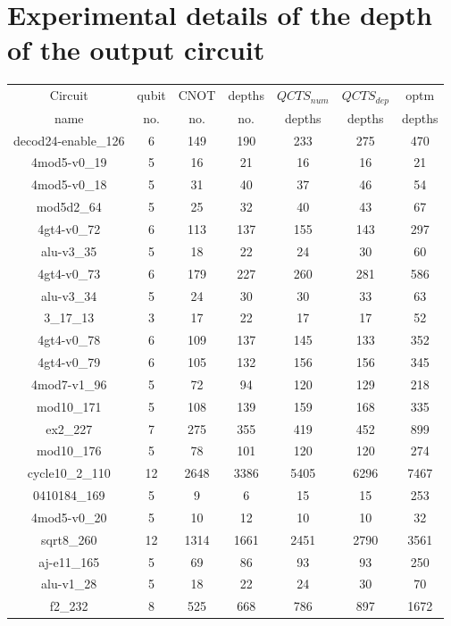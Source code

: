 \documentclass[runningheads]{llncs}
\begin{document}
\section{Experimental details of the depth of the output circuit}
					\begin{table}[H]
						\begin{center}  
						\begin{tabular}{|c|c|c|c|c|c|c|}
						\hline
						Circuit &  qubit  & CNOT &depths &$QCTS_{num}$& $QCTS_{dep}$  & optm 	  	\\
						 name	&   no. 	&	no. & no. & depths&  depths &  depths 	\\
						\hline
						decod24-enable\_126 & 6 & 149 & 190 & 233 & 275 & 470 \\
4mod5-v0\_19 & 5 & 16 & 21 & 16 & 16 & 21 \\
4mod5-v0\_18 & 5 & 31 & 40 & 37 & 46 & 54 \\
mod5d2\_64 & 5 & 25 & 32 & 40 & 43 & 67 \\
4gt4-v0\_72 & 6 & 113 & 137 & 155 & 143 & 297 \\
alu-v3\_35 & 5 & 18 & 22 & 24 & 30 & 60 \\
4gt4-v0\_73 & 6 & 179 & 227 & 260 & 281 & 586 \\
alu-v3\_34 & 5 & 24 & 30 & 30 & 33 & 63 \\
3\_17\_13 & 3 & 17 & 22 & 17 & 17 & 52 \\
4gt4-v0\_78 & 6 & 109 & 137 & 145 & 133 & 352 \\
4gt4-v0\_79 & 6 & 105 & 132 & 156 & 156 & 345 \\
4mod7-v1\_96 & 5 & 72 & 94 & 120 & 129 & 218 \\
mod10\_171 & 5 & 108 & 139 & 159 & 168 & 335 \\
ex2\_227 & 7 & 275 & 355 & 419 & 452 & 899 \\
mod10\_176 & 5 & 78 & 101 & 120 & 120 & 274 \\
cycle10\_2\_110 & 12 & 2648 & 3386 & 5405 & 6296 & 7467 \\
0410184\_169 & 5 & 9 & 6 & 15 & 15 & 253 \\
4mod5-v0\_20 & 5 & 10 & 12 & 10 & 10 & 32 \\
sqrt8\_260 & 12 & 1314 & 1661 & 2451 & 2790 & 3561 \\
aj-e11\_165 & 5 & 69 & 86 & 93 & 93 & 250 \\
alu-v1\_28 & 5 & 18 & 22 & 24 & 30 & 70 \\
f2\_232 & 8 & 525 & 668 & 786 & 897 & 1672 \\

\end{tabular}
\end{center}
\end{table}
\end{document}
